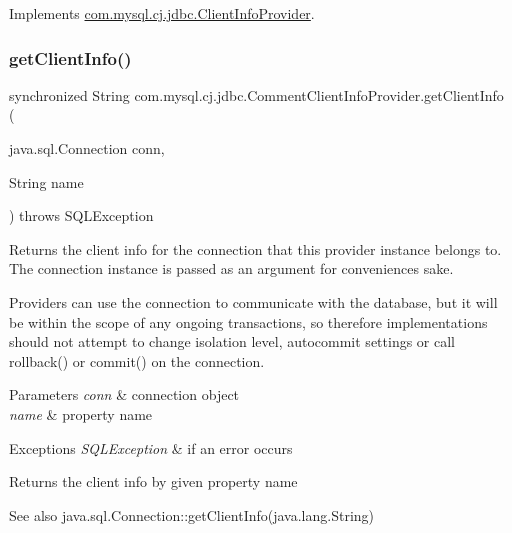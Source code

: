 Implements \mbox{\hyperlink{interfacecom_1_1mysql_1_1cj_1_1jdbc_1_1_client_info_provider_ac0bf93f0436618158753cb1f7ce7b463}{com.\+mysql.\+cj.\+jdbc.\+Client\+Info\+Provider}}.

\mbox{\label{classcom_1_1mysql_1_1cj_1_1jdbc_1_1_comment_client_info_provider_a6f82ab824da3031d66cf52b027077f9a}} 
\subsubsection{\texorpdfstring{get\+Client\+Info()}{getClientInfo()}\hspace{0.1cm}{\footnotesize\ttfamily [2/2]}}
{\footnotesize\ttfamily synchronized String com.\+mysql.\+cj.\+jdbc.\+Comment\+Client\+Info\+Provider.\+get\+Client\+Info (\begin{DoxyParamCaption}\item[{java.\+sql.\+Connection}]{conn,  }\item[{String}]{name }\end{DoxyParamCaption}) throws S\+Q\+L\+Exception}

Returns the client info for the connection that this provider instance belongs to. The connection instance is passed as an argument for convenience\textquotesingle{}s sake.

Providers can use the connection to communicate with the database, but it will be within the scope of any ongoing transactions, so therefore implementations should not attempt to change isolation level, autocommit settings or call rollback() or commit() on the connection.


\begin{DoxyParams}{Parameters}
{\em conn} & connection object \\
\hline
{\em name} & property name \\
\hline
\end{DoxyParams}

\begin{DoxyExceptions}{Exceptions}
{\em S\+Q\+L\+Exception} & if an error occurs \\
\hline
\end{DoxyExceptions}
\begin{DoxyReturn}{Returns}
the client info by given property name 
\end{DoxyReturn}
\begin{DoxySeeAlso}{See also}
java.\+sql.\+Connection\+::get\+Client\+Info(java.\+lang.\+String) 
\end{DoxySeeAlso}


